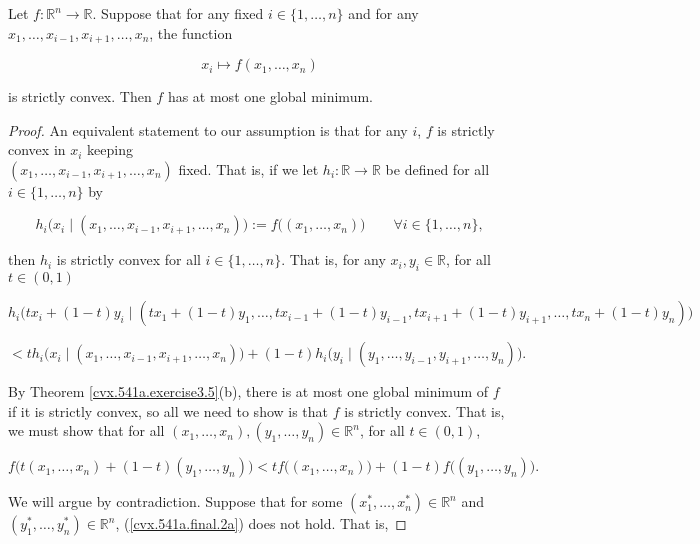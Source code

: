 \begin{proposition}Let \(f: \mathbb{R}^n \to \mathbb{R}\). Suppose that for any fixed \(i \in \{1, \ldots, n\}\) and for any \(x_1, \ldots, x_{i-1}, x_{i+1}, \ldots, x_n\), the function

\[
x_i \mapsto f(x_1, \ldots, x_n)
\]

is strictly convex. Then \(f\) has at most one global minimum.

\end{proposition}

\begin{proof}An equivalent statement to our assumption is that for any \(i\), \(f\) is strictly convex in \(x_i\) keeping \\ \((x_1, \ldots, x_{i-1}, x_{i+1}, \ldots, x_n)\) fixed. That is, if we let \(h_i: \mathbb{R} \to \mathbb{R}\) be defined for all \(i \in \{1, \ldots, n\}\) by

\[
h_i \big(x_i \mid (x_1, \ldots, x_{i-1}, x_{i+1}, \ldots, x_n) \big) := f\big( (x_1, \ldots, x_n) \big) \qquad \forall i \in \{1, \ldots, n\},
\] 

then \(h_i\) is strictly convex for all \(i \in \{1, \ldots, n\}\). That is, for any \(x_i, y_i \in \mathbb{R}\), for all \(t \in (0,1)\)

\[
 h_i \big(tx_i + (1-t)y_i  \mid (tx_1 + (1-t)y_1, \ldots, tx_{i-1} + (1-t)y_{i-1}, tx_{i+1} + (1-t)y_{i+1}, \ldots, tx_n + (1-t)y_n) \big) 
\]
 
\begin{equation}\label{cvx.541a.final.2b}
  < t h_i \big(x_i  \mid (x_1, \ldots, x_{i-1}, x_{i+1}, \ldots, x_n) \big) + (1-t) h_i \big(y_i \mid  (y_1, \ldots, y_{i-1}, y_{i+1}, \ldots, y_n)  \big).
\end{equation}

By Theorem \ref{cvx.541a.exercise3.5}(b), there is at most one global minimum of \(f\) if it is strictly convex, so all we need to show is that \(f\) is strictly convex. That is, we must show that for all \((x_1, \ldots, x_n), (y_1, \ldots, y_n) \in \mathbb{R}^n\), for all \(t \in (0,1)\),

\begin{equation}\label{cvx.541a.final.2a}
f \big(t(x_1, \ldots, x_n) + (1-t)(y_1, \ldots, y_n) \big) < t f \big( (x_1, \ldots, x_n)  \big) + (1-t) f \big( (y_1, \ldots, y_n)  \big).
\end{equation}

We will argue by contradiction. Suppose that for some \((x_1^*, \ldots, x_n^*) \in \mathbb{R}^n\) and \((y_1^*, \ldots, y_n^*) \in \mathbb{R}^n\), (\ref{cvx.541a.final.2a}) does not hold. That is, 


\end{proof}
